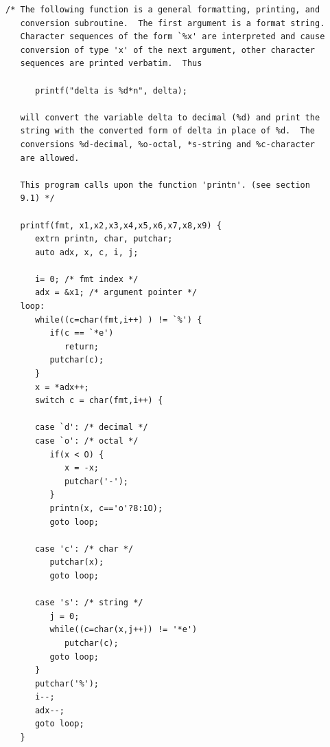 \documentclass[12pt]{report}
\begin{document}
\begin{verbatim}
/* The following function is a general formatting, printing, and
   conversion subroutine.  The first argument is a format string.
   Character sequences of the form `%x' are interpreted and cause
   conversion of type 'x' of the next argument, other character
   sequences are printed verbatim.  Thus

      printf("delta is %d*n", delta);

   will convert the variable delta to decimal (%d) and print the
   string with the converted form of delta in place of %d.  The
   conversions %d-decimal, %o-octal, *s-string and %c-character
   are allowed.

   This program calls upon the function 'printn'. (see section
   9.1) */

   printf(fmt, x1,x2,x3,x4,x5,x6,x7,x8,x9) {
      extrn printn, char, putchar;
      auto adx, x, c, i, j;

      i= 0; /* fmt index */
      adx = &x1; /* argument pointer */
   loop:
      while((c=char(fmt,i++) ) != `%') {
         if(c == `*e')
            return;
         putchar(c);
      }
      x = *adx++;
      switch c = char(fmt,i++) {

      case `d': /* decimal */
      case `o': /* octal */
         if(x < O) {
            x = -x;
            putchar('-');
         }
         printn(x, c=='o'?8:1O);
         goto loop;

      case 'c': /* char */
         putchar(x);
         goto loop;

      case 's': /* string */
         j = 0;
         while((c=char(x,j++)) != '*e')
            putchar(c);
         goto loop;
      }
      putchar('%');
      i--;
      adx--;
      goto loop;
   }
\end{verbatim}

\end{document}
